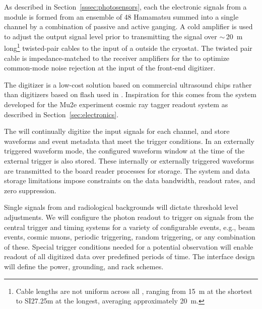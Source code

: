 As described in Section~\ref{sssec:photosensors}, each the electronic signals from a  module is formed from an ensemble of 48 Hamamatsu  summed into a single channel by a combination of passive and active ganging.  A cold amplifier is used to adjust the  output signal level prior to transmitting the signal over $\sim\,$\SI{20}{m} long\footnote{Cable lengths are not uniform across all , ranging from \SI{15}{m} at the shortest to SI{27.25}{m} at the longest, averaging approximately \SI{20}{m}.} twisted-pair cables to the input of a   outside the cryostat.  The twisted pair cable is impedance-matched to  the receiver amplifiers for the  to optimize common-mode noise rejection at the input of the front-end digitizer. 

The digitizer is a low-cost solution based on commercial ultrasound  chips rather than digitizers based on flash  used in . Inspiration for this  comes from the system developed for the Mu2e experiment cosmic ray tagger readout system as described in Section~\ref{sec:electronics}.

The  will continually digitize the input signals for each channel, and store waveforms and  event metadata that meet the trigger conditions. In an externally triggered waveform mode, the configured waveform window at the time of the external trigger is also stored. These internally or externally triggered waveforms are transmitted to the  board reader processes for storage. The  system and data storage limitations impose constraints on the data bandwidth, readout rates, and zero suppression. 

Single \phel signals from  and radiological backgrounds will dictate threshold level adjustments.
We will configure the photon readout to trigger on signals from the central trigger and timing systems for a variety of configurable events, e.g., beam events, cosmic
muons, periodic triggering, random triggering, or any combination of
these. Special trigger conditions needed for a potential  observation will enable readout of all digitized data over predefined periods of time.
The interface design will define the power, grounding, and rack schemes.

